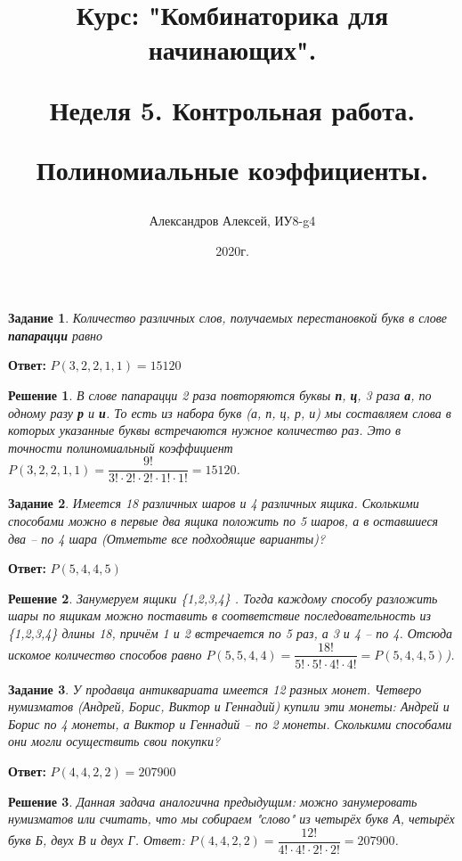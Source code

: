 \documentclass[a4paper,oneside]{memoir}
\title{Курс: "Комбинаторика для начинающих".
	
Неделя 5. Контрольная работа.
	 
Полиномиальные коэффициенты.}
\author{Александров Алексей, ИУ8-g4}
\date{2020г.}
\newtheorem{task}{Задание}
\newtheorem{solution}{Решение}
\begin{document}
	
\maketitle

\begin{task}
Количество различных слов, получаемых перестановкой букв в слове \textbf{папарацци} равно
\end{task}

\textbf{Ответ:} $ P(3,2,2,1,1) = 15120 $

\begin{solution}
В слове папарацци 2 раза повторяются буквы \textbf{п}, \textbf{ц}, 3 раза \textbf{а}, по одному разу \textbf{р} и \textbf{и}. То есть из набора букв  \textit{(а, п, ц, р, и)} мы составляем слова в которых указанные буквы встречаются нужное количество раз. Это в точности полиномиальный коэффициент $ P(3,2,2,1,1) = \dfrac{9!}{3!\cdot 2! \cdot 2! \cdot 1! \cdot 1!} = 15120 $.
\end{solution}

\hrulefill

\begin{task}
	Имеется 18 различных шаров и 4 различных ящика. Сколькими способами можно в первые два ящика положить по 5 шаров, а в оставшиеся два -- по 4 шара (Отметьте все подходящие варианты)?
\end{task}

\textbf{Ответ:} $ P(5,4,4,5) $

\begin{solution}
	Занумеруем ящики \{1,2,3,4\} . Тогда каждому способу разложить шары по ящикам можно поставить в соответствие последовательность из \{1,2,3,4\} длины 18, причём 1 и 2 встречается по 5 раз, а 3 и 4 -- по 4. Отсюда искомое количество способов равно $ P(5,5,4,4) =\dfrac{18!}{5!\cdot 5! \cdot 4! \cdot 4!} = P(5,4,4,5) $).
\end{solution}

\hrulefill

\begin{task}
	У продавца антиквариата имеется 12 разных монет. Четверо нумизматов (Андрей, Борис, Виктор и Геннадий) купили эти монеты: Андрей и Борис по 4 монеты, а Виктор и Геннадий -- по 2 монеты. Сколькими способами они могли осуществить свои покупки?
\end{task}

\textbf{Ответ:} $ P(4,4,2,2) = 207900 $

\begin{solution}
	Данная задача аналогична предыдущим: можно занумеровать нумизматов или считать, что мы собираем "слово" из четырёх букв А, четырёх букв Б, двух В и двух Г. Ответ: $ P(4,4,2,2) = \dfrac{12!}{4!\cdot 4! \cdot 2! \cdot 2!} = 207900 $.
\end{solution}
\end{document}
